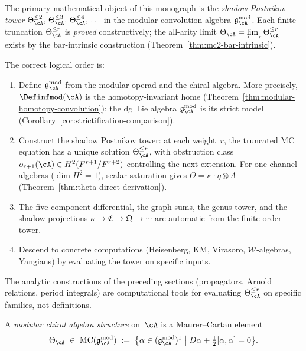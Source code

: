 \begin{remark}
\label{rem:unifying-principle}
The primary mathematical object of this monograph is the
\emph{shadow Postnikov tower}
$\Theta_\cA^{\leq 2},\, \Theta_\cA^{\leq 3},\,
\Theta_\cA^{\leq 4},\, \ldots$
in the modular convolution algebra
$\mathfrak{g}_{\cA}^{\mathrm{mod}}$.
Each finite truncation $\Theta_\cA^{\leq r}$ is \emph{proved}
constructively; the all-arity limit
$\Theta_\cA = \varprojlim_r \Theta_\cA^{\leq r}$ exists by the
bar-intrinsic construction
\textup{(}Theorem~\textup{\ref{thm:mc2-bar-intrinsic})}.

The correct logical order is:
\begin{enumerate}[label=\textup{(\arabic*)}]
\item Define $\mathfrak{g}_{\cA}^{\mathrm{mod}}$ from the modular
  operad and the chiral algebra.
  More precisely, $\Definfmod(\cA)$ is the homotopy-invariant
  home \textup{(}Theorem~\textup{\ref{thm:modular-homotopy-convolution})};
  the dg~Lie algebra $\mathfrak{g}_{\cA}^{\mathrm{mod}}$ is its
  strict model
  \textup{(}Corollary~\textup{\ref{cor:strictification-comparison})}.
\item Construct the shadow Postnikov tower: at each weight~$r$,
  the truncated MC equation has a unique solution
  $\Theta_\cA^{\leq r}$, with obstruction class
  $o_{r+1}(\cA) \in H^2(F^{r+1}/F^{r+2})$ controlling the next
  extension.  For one-channel algebras
  \textup{(}$\dim H^2 = 1$\textup{)}, scalar saturation gives
  $\Theta = \kappa \cdot \eta \otimes \Lambda$
  \textup{(}Theorem~\textup{\ref{thm:theta-direct-derivation})}.
\item The five-component differential, the graph sums, the genus
  tower, and the shadow projections
  $\kappa \to \mathfrak{C} \to \mathfrak{Q} \to \cdots$
  are automatic from the finite-order tower.
\item Descend to concrete computations \textup{(}Heisenberg, KM,
  Virasoro, $\mathcal{W}$-algebras, Yangians\textup{)} by
  evaluating the tower on specific inputs.
\end{enumerate}
The analytic constructions of the preceding sections
\textup{(}propagators, Arnold relations, period integrals\textup{)}
are computational tools for evaluating $\Theta_{\cA}^{\leq r}$
on specific families, not definitions.
\end{remark}

\begin{definition}
\label{def:modular-chiral-structure-mc}
A \emph{modular chiral algebra structure} on~$\cA$ is a
Maurer--Cartan element
\begin{equation}\label{eq:modular-mc-element}
\Theta_{\cA}
\;\in\;
\operatorname{MC}(\mathfrak{g}_{\cA}^{\mathrm{mod}})
\;:=\;
\bigl\{
\alpha \in (\mathfrak{g}_{\cA}^{\mathrm{mod}})^1
\;\big|\;
D\alpha + \tfrac12[\alpha,\alpha] = 0
\bigr\}.
\end{equation}
\end{definition}

